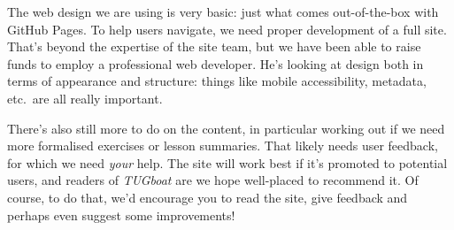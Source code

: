 \documentclass[harvardcite]{ltugboat}
\begin{document}
The web design we are using is very basic: just what comes out-of-the-box with
GitHub Pages. To help users navigate, we need proper development of a full
site. That's beyond the expertise of the site team, but we have been able to
raise funds to employ a professional web developer. He's looking at design both
in terms of appearance and structure: things like mobile accessibility,
metadata, etc.\ are all really important.

There's also still more to do on the content, in particular working out if we
need more formalised exercises or lesson summaries. That likely needs user
feedback, for which we need \emph{your} help. The site will work best if it's
promoted to potential users, and readers of \emph{TUGboat} are we hope
well-placed to recommend it. Of course, to do that, we'd encourage you to read
the site, give feedback and perhaps even suggest some improvements!

\makesignature
\end{document}
